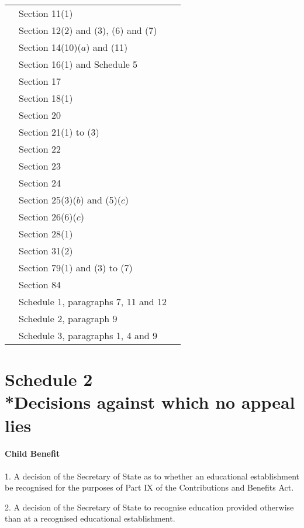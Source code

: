 \documentclass[12pt,a4paper]{article}
\begin{document}
{\begin{longtable}{p{150pt}p{102pt}p{102pt}}
&Section 11(1)\\
&Section 12(2) and (3), (6) and (7)\\
&Section 14(10)($a$) and (11)\\
&Section 16(1) and Schedule 5\\
&Section 17\\
&Section 18(1)\\
&Section 20\\
&Section 21(1) to (3)\\
&Section 22\\
&Section 23\\
&Section 24\\
&Section 25(3)($b$) and (5)($c$)\\
&Section 26(6)($c$)\\
&Section 28(1)\\
&Section 31(2)\\
&Section 79(1) and (3) to (7)\\
&Section 84\\
&Schedule 1, paragraphs 7, 11 and 12\\
&Schedule 2, paragraph 9\\
&Schedule 3, paragraphs 1, 4 and 9\\
\end{longtable}

}

\part[Schedule 2 --- Decisions against which no appeal lies]{Schedule 2\\*Decisions against which no appeal lies}

\renewcommand\parthead{--- Schedule 2}

\subsection*{Child Benefit}

1.  A decision of the Secretary of State as to whether an educational establishment be recognised for the purposes of Part IX of the Contributions and Benefits Act.

\medskip

2.  A decision of the Secretary of State to recognise education provided otherwise than at a recognised educational establishment.

\medskip
\end{document}

